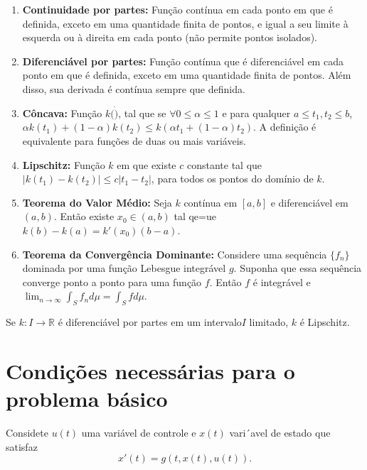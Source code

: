 \begin{enumerate}
    \item \label{parts-continue} \textbf{Continuidade por partes:} Função contínua em cada
    ponto em que é definida, exceto em uma quantidade finita de pontos, e igual a
    seu limite à esquerda ou à direita em cada ponto (não permite pontos
    isolados). 
    \item \textbf{Diferenciável por partes:} Função contínua que é
    diferenciável em cada ponto em que é definida, exceto em uma quantidade
    finita de pontos. Além disso, sua derivada é contínua sempre que definida. 
    \item \textbf{Côncava: } Função $k(\dot)$, tal que se $\forall 0 \leq
    \alpha \leq 1$ e para qualquer $a \leq t_1,t_2 \leq b$, $\alpha k(t_1) + (1 -
    \alpha)k(t_2) \leq k(\alpha t_1 + (1 - \alpha)t_2)$. A definição é
    equivalente para funções de duas ou mais variáveis.
    \item \textbf{Lipschitz: } Função $k$ em que existe $c$ constante tal que
    $|k(t_1) - k(t_2)| \leq c|t_1 - t_2|$, para todos os pontos do domínio de
    $k$. 
    \item \textbf{Teorema do Valor Médio:} Seja $k$ contínua em $[a,b]$ e
    diferenciável em $(a,b)$. Então existe $x_0 \in (a,b)$ tal qe=ue $k(b) -
    k(a) = k'(x_0)(b - a)$. 
    \item \textbf{Teorema da Convergência Dominante: } Considere uma sequência
    $\{f_n\}$ dominada por uma função Lebesgue integrável $g$. Suponha que
    essa sequência converge ponto a ponto para uma função $f$. Então $f$ é
    integrável e $\lim_{n \to \infty} \int_S f_n d\mu = \int_S f d\mu$.
\end{enumerate}

\begin{exercise}
    Se $k: I \to \mathbb{R}$ é diferenciável por partes em um intervalo$I$ limitado, $k$ é Lipschitz. 
\end{exercise}

\section{Condições necessárias para o problema básico} 

Considete $u(t)$ uma variável de controle e $x(t)$ vari´avel de estado que
satisfaz 
\begin{equation}
    \label{initial-system}
    x'(t) = g(t,x(t),u(t)). 
\end{equation}

